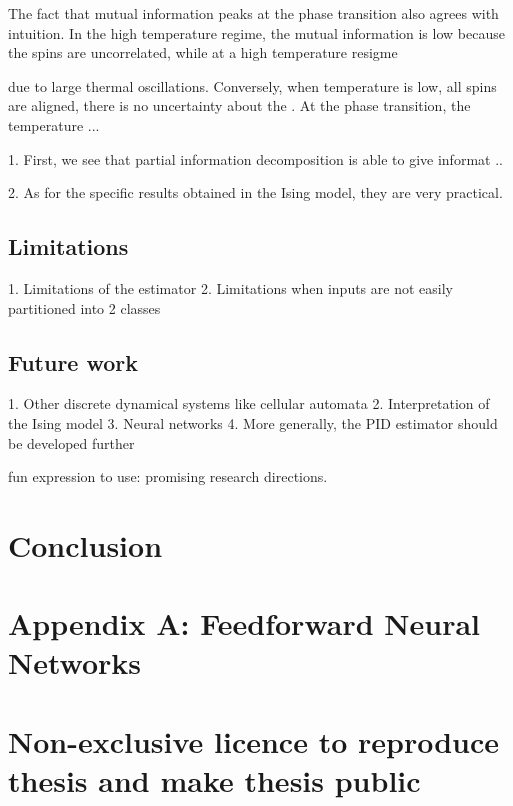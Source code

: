 \documentclass[12pt]{article}
\begin{document}
The fact that mutual information peaks at the phase transition also agrees with intuition. In the high temperature regime, the mutual information is low because the spins are uncorrelated, while at a high temperature resigme 

 due to large thermal oscillations. Conversely, when temperature is low, all spins are aligned, there is no uncertainty about the . At the phase transition, the temperature   ...

1. First, we see that partial information decomposition is able to give informat ..

2. As for the specific results obtained in the Ising model, they are very practical.

\subsection{Limitations}

1. Limitations of the estimator
2. Limitations when inputs are not easily partitioned into 2 classes

\subsection{Future work}

1. Other discrete dynamical systems like cellular automata
2. Interpretation of the Ising model 
3. Neural networks
4. More generally, the PID estimator should be developed further

fun expression to use: promising research directions.

\newpage
\section*{Conclusion}


\newpage



\newpage
\section*{Appendix A: Feedforward Neural Networks}


\appendix
\pagebreak
\section*{\small Non-exclusive licence to reproduce thesis and make thesis public}
\end{document}
